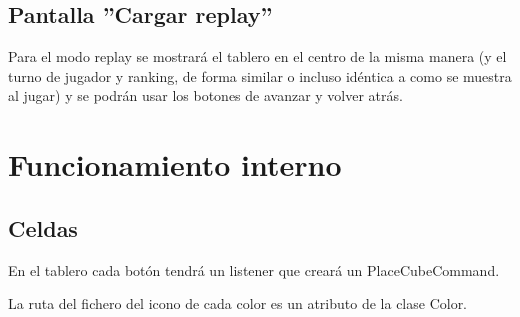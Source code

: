 \documentclass[14pt]{extreport}
\begin{document}
\subsection*{Pantalla ''Cargar replay''}
Para el modo replay se mostrará el tablero en el centro de la misma manera (y el turno de jugador y ranking, de forma similar o incluso idéntica a como se muestra al jugar) y se podrán usar los botones de avanzar y volver atrás.

\section*{Funcionamiento interno}
\subsection*{Celdas}
En el tablero cada botón tendrá un listener que creará un PlaceCubeCommand.

La ruta del fichero del icono de cada color es un atributo de la clase Color.
\end{document}
